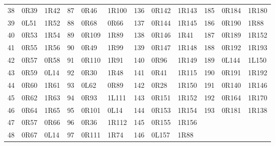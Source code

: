 \begin{longtable}{rll@{\hspace{1.3em}}rll@{\hspace{1.3em}}rll@{\hspace{1.3em}}rll}
38 & 0R39 & 1R42 & 87 & 0R46 & 1R100 & 136 & 0R142 & 1R143 & 185 & 0R184 & 1R180\\
39 & 0L51 & 1R52 & 88 & 0R68 & 0R66 & 137 & 0R144 & 1R145 & 186 & 0R190 & 1R88\\
40 & 0R53 & 1R54 & 89 & 0R109 & 1R89 & 138 & 0R146 & 1R41 & 187 & 0R189 & 1R152\\
41 & 0R55 & 1R56 & 90 & 0R49 & 1R99 & 139 & 0R147 & 1R148 & 188 & 0R192 & 1R193\\
42 & 0R57 & 0R58 & 91 & 0R110 & 1R91 & 140 & 0R96 & 1R149 & 189 & 0L144 & 1L150\\
43 & 0R59 & 0L14 & 92 & 0R30 & 1R48 & 141 & 0R41 & 1R115 & 190 & 0R191 & 1R192\\
44 & 0R60 & 1R61 & 93 & 0L62 & 0R89 & 142 & 0R28 & 1R150 & 191 & 0R140 & 1R146\\
45 & 0R62 & 1R63 & 94 & 0R93 & 1L111 & 143 & 0R151 & 1R152 & 192 & 0R164 & 1R170\\
46 & 0R64 & 1R65 & 95 & 0R101 & 0L14 & 144 & 0R153 & 1R154 & 193 & 0R181 & 1R138\\
47 & 0R57 & 0R66 & 96 & 0R36 & 1R112 & 145 & 0R155 & 1R156 &  &  & \\
48 & 0R67 & 0L14 & 97 & 0R111 & 1R74 & 146 & 0L157 & 1R88 &  &  & \\
\end{longtable}
\endgroup

\clearpage
